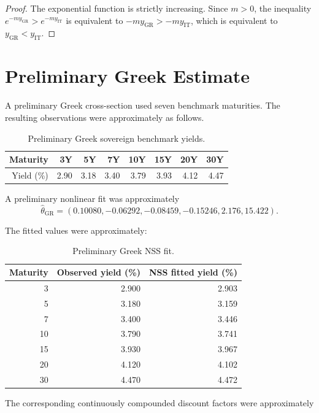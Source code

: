 \documentclass[a4paper,10pt]{article}
\theoremstyle{remark}
\begin{document}
\begin{proof}
The exponential function is strictly increasing. Since $m>0$, the inequality
$e^{-m y_{\mathrm{GR}}}>e^{-m y_{\mathrm{IT}}}$ is equivalent to
$-m y_{\mathrm{GR}}>-m y_{\mathrm{IT}}$, which is equivalent to
$y_{\mathrm{GR}}<y_{\mathrm{IT}}$.\end{proof}

\section{Preliminary Greek Estimate}

A preliminary Greek cross-section used seven benchmark maturities. The resulting observations were approximately as follows.

\begin{table}[H]
\centering
\caption{Preliminary Greek sovereign benchmark yields.}
\begin{tabular}{rrrrrrrr}
\toprule
Maturity & 3Y & 5Y & 7Y & 10Y & 15Y & 20Y & 30Y\\
\midrule
Yield (\%) & 2.90 & 3.18 & 3.40 & 3.79 & 3.93 & 4.12 & 4.47\\
\bottomrule
\end{tabular}
\end{table}

A preliminary nonlinear fit was approximately
\begin{equation}
\hat\theta_{\mathrm{GR}}
=(0.10080,-0.06292,-0.08459,-0.15246,2.176,15.422).
\end{equation}

The fitted values were approximately:

\begin{table}[H]
\centering
\caption{Preliminary Greek NSS fit.}
\begin{tabular}{rrr}
\toprule
Maturity & Observed yield (\%) & NSS fitted yield (\%)\\
\midrule
3 & 2.900 & 2.903\\
5 & 3.180 & 3.159\\
7 & 3.400 & 3.446\\
10 & 3.790 & 3.741\\
15 & 3.930 & 3.967\\
20 & 4.120 & 4.102\\
30 & 4.470 & 4.472\\
\bottomrule
\end{tabular}
\end{table}

The corresponding continuously compounded discount factors were approximately
\end{document}
